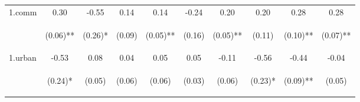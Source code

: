 \begin{center}
\begin{tabular}{lccccccccc}
\noalign{\smallskip}1.comm & 0.30 & -0.55 & 0.14 & 0.14 & -0.24 & 0.20 & 0.20 & 0.28 & 0.28\\
 & \begin{footnotesize}(0.06)**\end{footnotesize} & \begin{footnotesize}(0.26)*\end{footnotesize} & \begin{footnotesize}(0.09)\end{footnotesize} & \begin{footnotesize}(0.05)**\end{footnotesize} & \begin{footnotesize}(0.16)\end{footnotesize} & \begin{footnotesize}(0.05)**\end{footnotesize} & \begin{footnotesize}(0.11)\end{footnotesize} & \begin{footnotesize}(0.10)**\end{footnotesize} & \begin{footnotesize}(0.07)**\end{footnotesize}\\
\noalign{\smallskip}1.urban & -0.53 & 0.08 & 0.04 & 0.05 & 0.05 & -0.11 & -0.56 & -0.44 & -0.04\\
 & \begin{footnotesize}(0.24)*\end{footnotesize} & \begin{footnotesize}(0.05)\end{footnotesize} & \begin{footnotesize}(0.06)\end{footnotesize} & \begin{footnotesize}(0.06)\end{footnotesize} & \begin{footnotesize}(0.03)\end{footnotesize} & \begin{footnotesize}(0.06)\end{footnotesize} & \begin{footnotesize}(0.23)*\end{footnotesize} & \begin{footnotesize}(0.09)**\end{footnotesize} & \begin{footnotesize}(0.05)\end{footnotesize}\\

\end{tabular}
\end{center}
